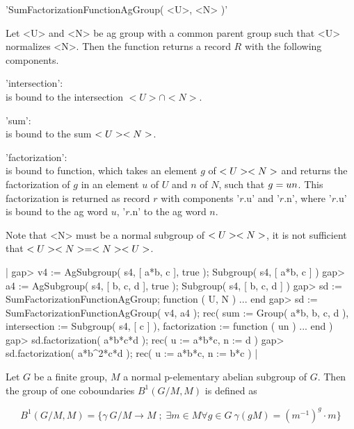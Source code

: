
'SumFactorizationFunctionAgGroup( <U>, <N> )'

Let <U> and <N>  be ag group with a   common parent  group such that  <U>
normalizes  <N>.  Then   the  function returns a   record  $R$  with  the
following components.

'intersection': \\
        is bound to the intersection $<U> \cap <N>$.

'sum': \\
        is  bound  to  the  sum  $<U> \* <N>$.

'factorization': \\
        is  bound    to function, which     takes  an   element $g$  of
        $<U>   \* <N>$  and returns   the   factorization  of $g$ in an
        element $u$   of   $U$ and    $n$ of $N$,   such  that  $g  = u
        {\*}  n$.   This factorization  is   returned  as  record   $r$
        with  components    '$r$.u'  and   '$r$.n', where  '$r$.u'   is
        bound to the ag word $u$, '$r$.n' to the ag word $n$.

Note  that  <N>  must  be  a  normal subgroup of $<U> \* <N>$,  it is not
sufficient that $<U> \* <N> = <N> \* <U>$.

|    gap> v4 := AgSubgroup( s4, [ a*b, c ], true );
    Subgroup( s4, [ a*b, c ] )
    gap> a4 := AgSubgroup( s4, [ b, c, d ], true );
    Subgroup( s4, [ b, c, d ] )
    gap> sd := SumFactorizationFunctionAgGroup;
    function ( U, N ) ... end
    gap> sd := SumFactorizationFunctionAgGroup( v4, a4 );
    rec(
      sum := Group( a*b, b, c, d ),
      intersection := Subgroup( s4, [ c ] ),
      factorization := function ( un ) ... end )
    gap> sd.factorization( a*b*c*d );
    rec(
      u := a*b*c,
      n := d )
    gap> sd.factorization( a*b^2*c*d );
    rec(
      u := a*b*c,
      n := b*c ) |



Let $G$ be a finite group, $M$  a normal p-elementary abelian subgroup of
$G$.  Then the group of one coboundaries $B^1( G/M, M )$ is defined as

\begin{displaymath}
  B^1( G/M, M ) = \{ \gamma \: G/M \rightarrow M \; ; \; \exists m\in M\forall
                     g\in G \: \gamma( gM ) = (m^{-1})^g \cdot m \}
\end{displaymath}

